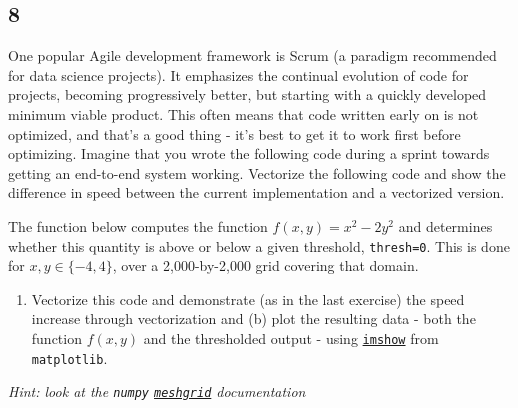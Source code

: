 \documentclass[11pt]{article}
\providecommand{\tightlist}{%
      \setlength{\itemsep}{0pt}\setlength{\parskip}{0pt}}
\begin{document}
    \subsection{8}\label{section}

One popular Agile development framework is Scrum (a paradigm recommended
for data science projects). It emphasizes the continual evolution of
code for projects, becoming progressively better, but starting with a
quickly developed minimum viable product. This often means that code
written early on is not optimized, and that's a good thing - it's best
to get it to work first before optimizing. Imagine that you wrote the
following code during a sprint towards getting an end-to-end system
working. Vectorize the following code and show the difference in speed
between the current implementation and a vectorized version.

The function below computes the function \(f(x,y) = x^2 - 2 y^2\) and
determines whether this quantity is above or below a given threshold,
\texttt{thresh=0}. This is done for \(x,y \in \{-4,4\}\), over a
2,000-by-2,000 grid covering that domain.

\begin{enumerate}
\def\labelenumi{(\alph{enumi})}
\tightlist
\item
  Vectorize this code and demonstrate (as in the last exercise) the
  speed increase through vectorization and (b) plot the resulting data -
  both the function \(f(x,y)\) and the thresholded output - using
  \href{https://matplotlib.org/api/_as_gen/matplotlib.pyplot.imshow.html?highlight=matplotlib\%20pyplot\%20imshow\#matplotlib.pyplot.imshow}{\texttt{imshow}}
  from \texttt{matplotlib}.
\end{enumerate}

\emph{Hint: look at the \texttt{numpy}
\href{https://docs.scipy.org/doc/numpy-1.13.0/reference/generated/numpy.meshgrid.html}{\texttt{meshgrid}}
documentation}
\end{document}
